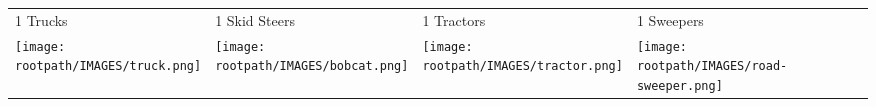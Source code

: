 \begin{tabular}{m{}m{}m{}m{}}
    {\color{ccorange} 1 Trucks} & {\color{ccorange} 1 Skid Steers} & {\color{ccorange} 1 Tractors} & {\color{ccorange} 1 Sweepers} \\
    \texttt{[image: \\rootpath/IMAGES/truck.png]}  & \texttt{[image: \\rootpath/IMAGES/bobcat.png]} & \texttt{[image: \\rootpath/IMAGES/tractor.png]} & \texttt{[image: \\rootpath/IMAGES/road-sweeper.png]}                         
    \end{tabular}